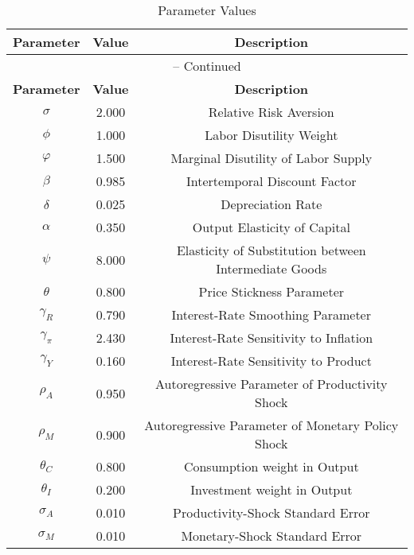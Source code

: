 \begin{center}
\begin{longtable}{ccc}
\caption{Parameter Values}\\%
\toprule%
\multicolumn{1}{c}{\textbf{Parameter}} &
\multicolumn{1}{c}{\textbf{Value}} &
 \multicolumn{1}{c}{\textbf{Description}}\\%
\midrule%
\endfirsthead
\multicolumn{3}{c}{{\tablename} \thetable{} -- Continued}\\%
\midrule%
\multicolumn{1}{c}{\textbf{Parameter}} &
\multicolumn{1}{c}{\textbf{Value}} &
  \multicolumn{1}{c}{\textbf{Description}}\\%
\midrule%
\endhead
${\sigma}$ 	 & 	 2.000 	 & 	 Relative Risk Aversion\\
${\phi}$ 	 & 	 1.000 	 & 	 Labor Disutility Weight\\
${\varphi}$ 	 & 	 1.500 	 & 	 Marginal Disutility of Labor Supply\\
${\beta}$ 	 & 	 0.985 	 & 	 Intertemporal Discount Factor\\
${\delta}$ 	 & 	 0.025 	 & 	 Depreciation Rate\\
${\alpha}$ 	 & 	 0.350 	 & 	 Output Elasticity of Capital\\
${\psi}$ 	 & 	 8.000 	 & 	 Elasticity of Substitution between Intermediate Goods\\
${\theta}$ 	 & 	 0.800 	 & 	 Price Stickness Parameter\\
${\gamma_R}$ 	 & 	 0.790 	 & 	 Interest-Rate Smoothing Parameter\\
${\gamma_\pi}$ 	 & 	 2.430 	 & 	 Interest-Rate Sensitivity to Inflation\\
${\gamma_Y}$ 	 & 	 0.160 	 & 	 Interest-Rate Sensitivity to Product\\
${\rho_A}$ 	 & 	 0.950 	 & 	 Autoregressive Parameter of Productivity Shock\\
${\rho_M}$ 	 & 	 0.900 	 & 	 Autoregressive Parameter of Monetary Policy Shock\\
${\theta_C}$ 	 & 	 0.800 	 & 	 Consumption weight in Output\\
${\theta_I}$ 	 & 	 0.200 	 & 	 Investment weight in Output\\
${\sigma_A}$ 	 & 	 0.010 	 & 	 Productivity-Shock Standard Error\\
${\sigma_M}$ 	 & 	 0.010 	 & 	 Monetary-Shock Standard Error\\
\bottomrule%
\end{longtable}
\end{center}
